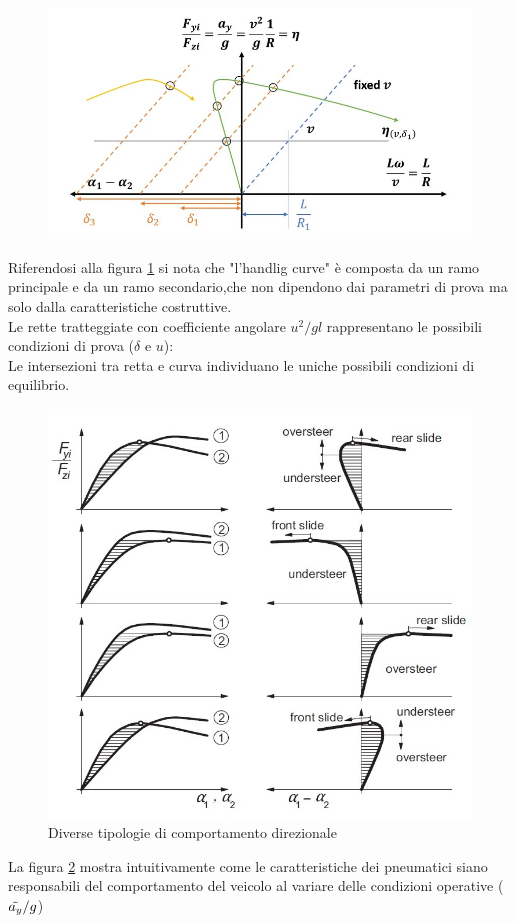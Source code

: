 \begin{figure}[!h]
    \centering
    \includegraphics[scale=0.7]{Immagini/Understeer Gradient/handling diagram(2).jpg}
    \caption{}
    \label{fig:Handling Diagram2}
\end{figure}
Riferendosi alla figura \ref{fig:Handling Diagram2} si nota che "l'handlig curve" è composta da un ramo principale e da un
ramo secondario,che non dipendono dai parametri di prova ma solo dalla caratteristiche costruttive.\\
Le rette tratteggiate con coefficiente angolare $u^2/gl$ rappresentano le possibili condizioni di prova ($\delta$ e $u$):\\
Le intersezioni tra retta e curva individuano le uniche possibili condizioni di equilibrio.\\ 
\begin{figure}[!h]
    \centering
    \includegraphics[scale=0.7]{Immagini/Understeer Gradient/handling Diagrams.jpg}
    \caption{Diverse tipologie di comportamento direzionale}
    \label{fig:Handling Diagrams}
\end{figure}
La figura \ref{fig:Handling Diagrams} mostra intuitivamente come le caratteristiche dei pneumatici siano responsabili del comportamento del veicolo al variare delle condizioni operative ($\Tilde{a_y}/g$) 


